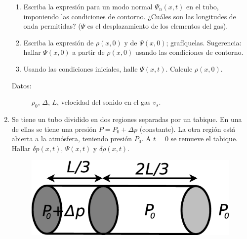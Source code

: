 \documentclass[11pt,spanish,a4paper]{article}
\begin{document}
\begin{enumerate}
\begin{enumerate}
\item Escriba la expresión para un modo normal $\Psi_{n}(x,t)$ en el tubo,
imponiendo las condiciones de contorno. ¿Cuáles son las longitudes
de onda permitidas? ($\Psi$ es el desplazamiento de los elementos
del gas). 
\item Escriba la expresión de $\rho(x,0)$ y de $\Psi(x,0)$; grafíquelas.
Sugerencia: hallar $\Psi(x,0)$ a partir de $\rho(x,0)$ usando las
condiciones de contorno. 
\item Usando las condiciones iniciales, halle $\Psi(x,t)$. Calcule $\rho(x,0)$. \end{enumerate}
\begin{description}
\item [{Datos:}] $\rho_{0}$, $\Delta$, $L$, velocidad del sonido en
el gas $v_{s}$.
\end{description}
\item Se tiene un tubo dividido en dos regiones separadas por un tabique.
En una de ellas se tiene una presión $P=P_{0}+\Delta p$ (constante).
La otra región está abierta a la atmósfera, teniendo presión $P_{0}$.
A $t=0$ se remueve el tabique. Hallar $\delta p(x,t)$, $\Psi(x,t)$
y $\delta\rho(x,t)$.
\begin{figure}[H]
\centering{}\includegraphics[clip,scale=0.25]{ej1-31}
\end{figure}



\end{enumerate}
\end{document}
